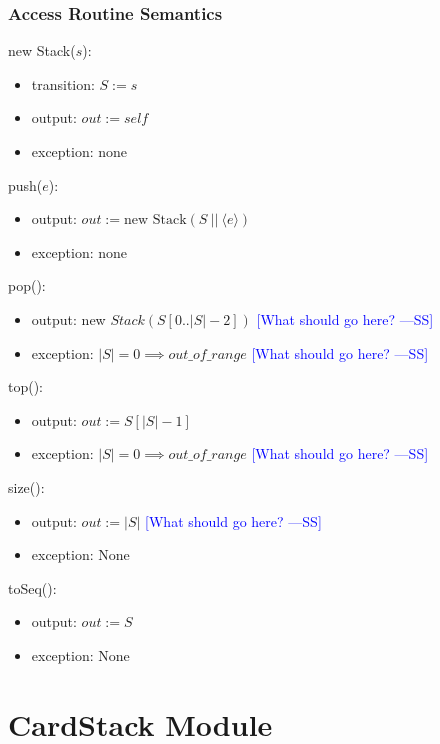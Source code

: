 \documentclass[12pt]{article}
\newcommand{\authornote}[3]{\textcolor{#1}{[#3 ---#2]}}
\newcommand{\authornote}[3]{}
\newcommand{\wss}[1]{\authornote{blue}{SS}{#1}}
\begin{document}
\subsubsection* {Access Routine Semantics}

new Stack($s$):
\begin{itemize}
\item transition: $S := s$

\item output: $\mathit{out} := \mathit{self}$
\item exception: none
\end{itemize}

\noindent push($e$):
\begin{itemize}
\item output: $out := \text{new Stack}(S\ ||\ \langle e \rangle)$
\item exception: none
\end{itemize}

\noindent pop():
\begin{itemize}
\item output: new $Stack(S[0..|S|-2])$ \wss{What should go here?}
\item exception: $|S| = 0 \implies out\_of\_range$  \wss{What should go here?}

\end{itemize}

\noindent top():
\begin{itemize}
\item output: $\mathit{out} := S[|S| - 1]$
\item exception: $|S| = 0 \implies out\_of\_range$ \wss{What should go here?}

\end{itemize}

\noindent size():
\begin{itemize}
\item output: $\mathit{out} := |S|$ \wss{What should go here?}
\item exception: None
\end{itemize}

\noindent toSeq():
\begin{itemize}
\item output: $\mathit{out} := S$
\item exception: None

\end{itemize}

\newpage

\section* {CardStack Module}
\end{document}

